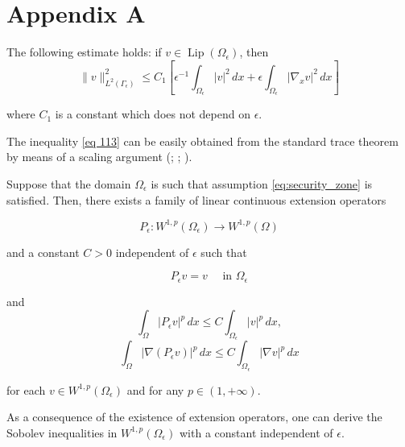 \section{Appendix A}
\begin{lemma} The following estimate holds: if $v \in \operatorname{Lip}\left(\Omega_{\epsilon}\right)$, then
\begin{equation}
  \|v\|_{L^{2}\left(\Gamma_{\epsilon}\right)}^{2} \leq C_{1}\left[\epsilon^{-1} \int_{\Omega_{\epsilon}}|v|^{2} \, d  x+\epsilon \int_{\Omega_{\epsilon}}\left|\nabla_{x} v\right|^{2} \, d  x\right]
\label{eq 113}\end{equation}


where $C_{1}$ is a constant which does not depend on $\epsilon$.
\label{lemma 7.1}\end{lemma}
The inequality \eqref{eq 113} can be easily obtained from the standard trace theorem by means of a scaling argument (\cite{Allaire_et_al}; \cite{Piat_Piatnitski_2010}; \cite{Piat_Nazarov_Piatnitski_2012}).
\begin{lemma}
  
 Suppose that the domain $\Omega_{\epsilon}$ is such that assumption \eqref{eq:security_zone} is satisfied. Then, there exists a family of linear continuous extension operators

$$
P_{\epsilon}: W^{1, p}\left(\Omega_{\epsilon}\right) \rightarrow W^{1, p}(\Omega)
$$

and a constant $C>0$ independent of $\epsilon$ such that

$$
P_{\epsilon} v=v \quad \text { in } \Omega_{\epsilon}
$$

and
\begin{equation}
  \int_{\Omega}\left|P_{\epsilon} v\right|^{p} \, d  x \leq C \int_{\Omega_{\epsilon}}|v|^{p} \, d  x,
\label{eq 114}\end{equation}
\begin{equation}
  \int_{\Omega}\left|\nabla\left(P_{\epsilon} v\right)\right|^{p} \, d  x \leq C \int_{\Omega_{\epsilon}}|\nabla v|^{p} \, d  x
\label{eq 115}\end{equation}

for each $v \in W^{1, p}\left(\Omega_{\epsilon}\right)$ and for any $p \in(1,+\infty)$.
\label{lemma 7.2}\end{lemma}


As a consequence of the existence of extension operators, one can derive the Sobolev inequalities in $W^{1, p}\left(\Omega_{\epsilon}\right)$ with a constant independent of $\epsilon$.


